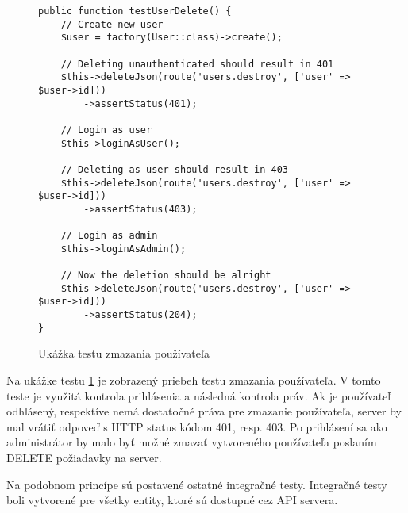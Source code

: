 \begin{figure}[H]
\begin{verbatim}
public function testUserDelete() {
    // Create new user
    $user = factory(User::class)->create();

    // Deleting unauthenticated should result in 401
    $this->deleteJson(route('users.destroy', ['user' => $user->id]))
        ->assertStatus(401);

    // Login as user
    $this->loginAsUser();

    // Deleting as user should result in 403
    $this->deleteJson(route('users.destroy', ['user' => $user->id]))
        ->assertStatus(403);

    // Login as admin
    $this->loginAsAdmin();

    // Now the deletion should be alright
    $this->deleteJson(route('users.destroy', ['user' => $user->id]))
        ->assertStatus(204);
}
\end{verbatim}
\caption[Ukážka testu zmazania používateľa]
{Ukážka testu zmazania používateľa}
\label{user-delete-test-code}
\end{figure}

Na ukážke testu \ref{user-delete-test-code} je zobrazený priebeh testu zmazania používateľa. V tomto teste je využitá kontrola prihlásenia a následná kontrola práv. Ak je používateľ odhlásený, respektíve nemá dostatočné práva pre zmazanie používateľa, server by mal vrátiť odpoveď s HTTP status kódom 401, resp. 403. Po prihlásení sa ako administrátor by malo byť možné zmazať vytvoreného používateľa poslaním DELETE požiadavky na server.

Na podobnom princípe sú postavené ostatné integračné testy. Integračné testy boli vytvorené pre všetky entity, ktoré sú dostupné cez API servera.





